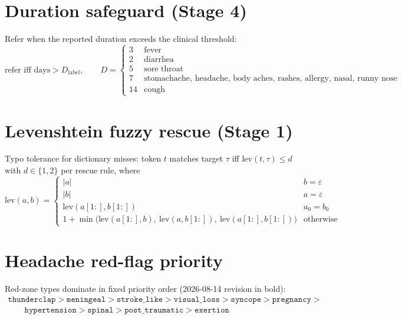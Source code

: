\documentclass[11pt]{article}
\begin{document}
\section{Duration safeguard (Stage 4)}
Refer when the reported duration exceeds the clinical threshold:
\begin{equation}
\text{refer iff } \text{days} > D_{\text{label}},
\qquad
D = \begin{cases}
3 & \text{fever}\\
2 & \text{diarrhea}\\
5 & \text{sore throat}\\
7 & \text{stomachache, headache, body aches, rashes, allergy, nasal, runny nose}\\
14 & \text{cough}
\end{cases}
\end{equation}

\section{Levenshtein fuzzy rescue (Stage 1)}
Typo tolerance for dictionary misses: token $t$ matches target $\tau$ iff
$\mathrm{lev}(t,\tau) \leq d$ with $d\in\{1,2\}$ per rescue rule, where
\begin{equation}
\mathrm{lev}(a,b) = \begin{cases}
|a| & b = \varepsilon\\
|b| & a = \varepsilon\\
\mathrm{lev}(a[1:],b[1:]) & a_0 = b_0\\
1 + \min\!\Big(\mathrm{lev}(a[1:],b),\ \mathrm{lev}(a,b[1:]),\
\mathrm{lev}(a[1:],b[1:])\Big) & \text{otherwise}
\end{cases}
\end{equation}

\section{Headache red-flag priority}
Red-zone types dominate in fixed priority order (2026-08-14 revision in
bold):
\begin{equation}
\begin{array}{l}
\texttt{thunderclap} > \texttt{meningeal} > \texttt{stroke\_like} >
\texttt{visual\_loss} > \texttt{syncope} > \texttt{pregnancy} > \\
\qquad \texttt{hypertension} > \texttt{spinal} > \texttt{post\_traumatic} >
\texttt{exertion}
\end{array}
\end{equation}
\end{document}
